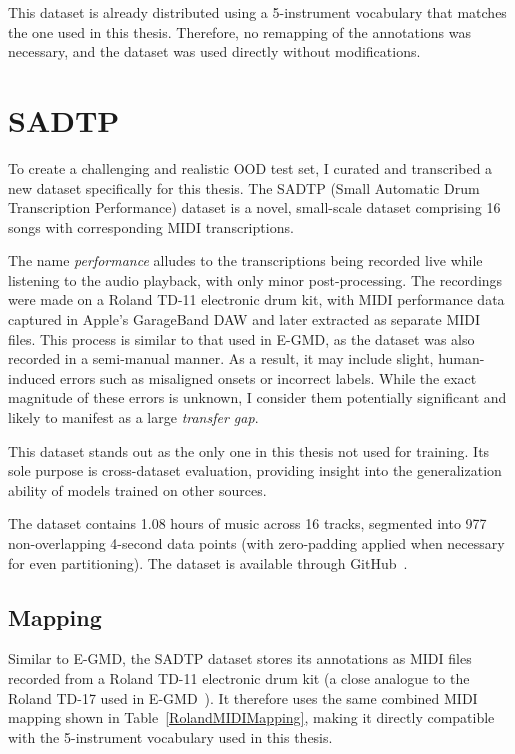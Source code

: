 This dataset is already distributed using a 5-instrument vocabulary that matches the one used in this thesis. Therefore, no remapping of the annotations was necessary, and the dataset was used directly without modifications.

\section{SADTP}

To create a challenging and realistic \acrfull{OOD} test set, I curated and transcribed a new dataset specifically for this thesis. The SADTP (Small Automatic Drum Transcription Performance) dataset is a novel, small-scale dataset comprising 16 songs with corresponding MIDI transcriptions. 

The name \textit{performance} alludes to the transcriptions being recorded live while listening to the audio playback, with only minor post-processing. The recordings were made on a Roland TD-11 electronic drum kit, with MIDI performance data captured in Apple's GarageBand \gls{DAW} and later extracted as separate MIDI files. This process is similar to that used in E-GMD, as the dataset was also recorded in a semi-manual manner. As a result, it may include slight, human-induced errors such as misaligned onsets or incorrect labels. While the exact magnitude of these errors is unknown, I consider them potentially significant and likely to manifest as a large \textit{transfer gap}.

This dataset stands out as the only one in this thesis not used for training. Its sole purpose is cross-dataset evaluation, providing insight into the generalization ability of models trained on other sources.

The dataset contains 1.08 hours of music across 16 tracks, segmented into 977 non-overlapping 4-second data points (with zero-padding applied when necessary for even partitioning). The dataset is available through GitHub~\cite{fosse_sadtp_2025}.

\subsection{Mapping}

Similar to E-GMD, the SADTP dataset stores its annotations as MIDI files recorded from a Roland TD-11 electronic drum kit (a close analogue to the Roland TD-17 used in E-GMD~\cite{callender2020improvingperceptualqualitydrum}). It therefore uses the same combined MIDI mapping shown in Table~\ref{RolandMIDIMapping}, making it directly compatible with the 5-instrument vocabulary used in this thesis.

